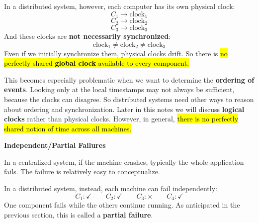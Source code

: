 \highspace
In a distributed system, however, each computer has its own physical clock:
\begin{equation*}
    C_1 \rightarrow \text{clock}_1
\end{equation*}
\begin{equation*}
    C_2 \rightarrow \text{clock}_2
\end{equation*}
\begin{equation*}
    C_3 \rightarrow \text{clock}_3
\end{equation*}
And these clocks are \textbf{not necessarily synchronized}:
\begin{equation*}
    \text{clock}_1 \neq \text{clock}_2 \neq \text{clock}_3
\end{equation*}
Even if we initially synchronize them, physical clocks drift. So there is \hl{no perfectly shared \textbf{global clock} available to every component.}

\highspace
This becomes especially problematic when we want to determine the \textbf{ordering of events}. Looking only at the local timestamps may not always be sufficient, because the clocks can disagree. So distributed systems need other ways to reason about ordering and synchronization. Later in this notes we will discuss \textbf{logical clocks} rather than physical clocks. However, in general, \hl{there is no perfectly shared notion of time across all machines.}

\highspace
\begin{flushleft}
    \textcolor{Green3}{ \textbf{Independent/Partial Failures}}
\end{flushleft}
In a centralized system, if the machine crashes, typically the whole application fails. The failure is relatively easy to conceptualize.

\highspace
In a distributed system, instead, each machine can fail independently:
\begin{equation*}
    C_1:\checkmark
    \qquad
    C_2:\checkmark
    \qquad
    C_3:\times
    \qquad
    C_4:\checkmark
\end{equation*}
One component fails while the others continue running. As anticipated in the previous section, this is called a \textbf{partial failure}.

